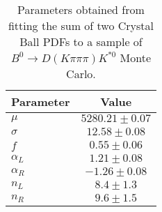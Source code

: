 \begin{table}[h]
  \centering
  \begin{tabular}{lc}
      \toprule
      Parameter & Value \\
      \midrule
      $\mu$ & $5280.21 \pm 0.07$ \\
      $\sigma$ & $12.58 \pm 0.08$ \\
      $f$ & $0.55 \pm 0.06$ \\
      $\alpha_L$ & $1.21 \pm 0.08$ \\
      $\alpha_R$ & $-1.26 \pm 0.08$ \\
      $n_L$ & $8.4 \pm 1.3$ \\
      $n_R$ & $9.6 \pm 1.5$ \\
  \bottomrule
  \end{tabular}
  \caption{Parameters obtained from fitting the sum of two Crystal Ball PDFs to a sample of $B^0 \to D(K\pi\pi\pi)K^{*0}$ Monte Carlo.}
\label{tab:signal_Kpipipi_MC_params}
\end{table}
